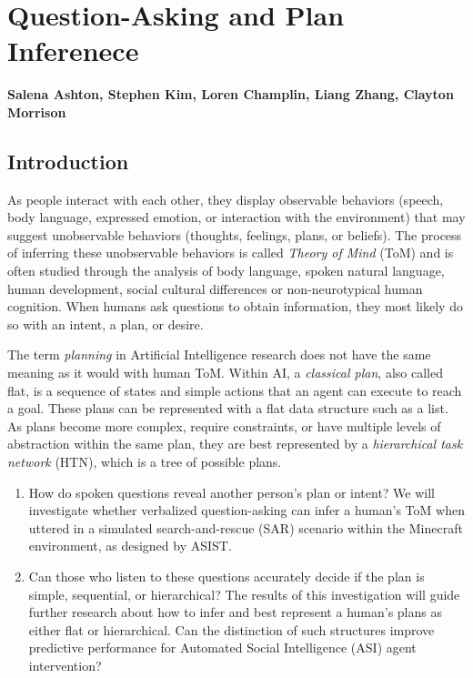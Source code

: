 \chapter{Question-Asking and Plan Inferenece}
\label{ch:question_plan}
\textbf{Salena Ashton, Stephen Kim, Loren Champlin, Liang Zhang, Clayton Morrison}

\section{Introduction}

As people interact with each other, they display observable behaviors (speech,
body language, expressed emotion, or interaction with the environment) that may
suggest unobservable behaviors (thoughts, feelings, plans, or beliefs). The
process of inferring these unobservable behaviors is called \textit{Theory of
Mind} (ToM) and is often studied through the analysis of body language, spoken natural language, human development, social cultural differences or non-neurotypical human cognition. When humans ask questions to obtain information, they most likely do so with an intent, a plan, or desire.

The term \textit{planning} in Artificial Intelligence research does not have
the same meaning as it would with human ToM. Within AI, a \textit{classical
plan}, also called flat, is a sequence of states and simple actions that an
agent can execute to reach a goal. These plans can be represented with a flat
data structure such as a list. As plans become more complex, require
constraints, or have multiple levels of abstraction within the same plan, they
are best represented by a \textit{hierarchical task network} (HTN), which is a tree of possible plans.

\begin{enumerate}
    \item How do spoken questions reveal another person’s plan or intent? We will investigate whether verbalized question-asking can infer a human’s ToM
when uttered in a simulated search-and-rescue (SAR) scenario within the
Minecraft environment, as designed by ASIST.
    \item Can those who listen to these questions accurately decide if the plan is simple, sequential, or hierarchical? The results of this investigation will guide further research about how to
infer and best represent a human's plans as either flat or hierarchical. Can
the distinction of such structures improve predictive performance for Automated
Social Intelligence (ASI) agent intervention?
\end{enumerate}



